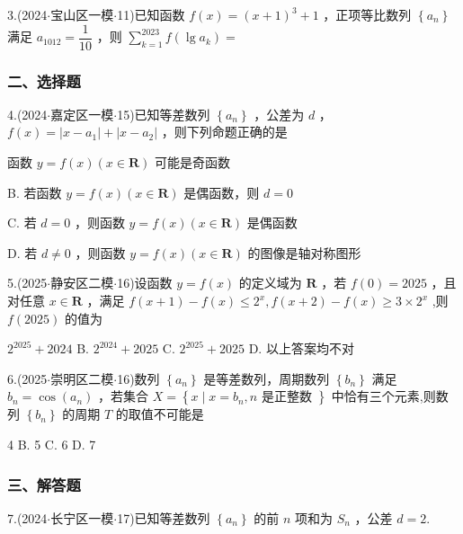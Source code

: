 3.(2024$\cdot$宝山区一模$\cdot$11)已知函数 $f\left( x\right)  = {\left( x + 1\right) }^{3} + 1$ ，正项等比数列 $\left\{  {a}_{n}\right\}$ 满足 ${a}_{1012} = \dfrac{1}{10}$ ，则 $\mathop{\sum }\limits_{{k = 1}}^{{2023}}f\left( {\lg {a}_{k}}\right)  =$

\subsubsection*{二、选择题}

4.(2024$\cdot$嘉定区一模$\cdot$15)已知等差数列 $\left\{  {a}_{n}\right\}$ ，公差为 $d$ ， $f\left( x\right)  = \left| {x - {a}_{1}}\right|  + \left| {x - {a}_{2}}\right|$ ，则下列命题正确的是 \dotfill{(\kh{})}

\xx{}{}{}{}函数 $y = f\left( x\right) \left( {x \in  \mathbf{R}}\right)$ 可能是奇函数

B. 若函数 $y = f\left( x\right) \left( {x \in  \mathbf{R}}\right)$ 是偶函数，则 $d = 0$

C. 若 $d = 0$ ，则函数 $y = f\left( x\right) \left( {x \in  \mathbf{R}}\right)$ 是偶函数

D. 若 $d \neq  0$ ，则函数 $y = f\left( x\right) \left( {x \in  \mathbf{R}}\right)$ 的图像是轴对称图形

5.(2025$\cdot$静安区二模$\cdot$16)设函数 $y = f\left( x\right)$ 的定义域为 $\mathbf{R}$ ，若 $f\left( 0\right)  = {2025}$ ，且对任意 $x \in  \mathbf{R}$ ，满足 $f\left( {x + 1}\right)  - f\left( x\right)  \leq  {2}^{x},f\left( {x + 2}\right)  - f\left( x\right)  \geq  3 \times  {2}^{x}$ ,则 $f\left( {2025}\right)$ 的值为 \dotfill{(\kh{})}

\xx{}{}{}{}${2}^{2025} + {2024}$ B. ${2}^{2024} + {2025}$ C. ${2}^{2025} + {2025}$ D. 以上答案均不对

6.(2025$\cdot$崇明区二模$\cdot$16)数列 $\left\{  {a}_{n}\right\}$ 是等差数列，周期数列 $\left\{  {b}_{n}\right\}$ 满足 ${b}_{n} = \cos \left( {a}_{n}\right)$ ，若集合 $X =  \left\{  {x \mid  x = {b}_{n},n\text{ 是正整数 }}\right\}$ 中恰有三个元素,则数列 $\left\{  {b}_{n}\right\}$ 的周期 $T$ 的取值不可能是 \dotfill{(\kh{})}

\xx{}{}{}{}4 B. 5 C. 6 D. 7

\subsubsection*{三、解答题}

7.(2024$\cdot$长宁区一模$\cdot$17)已知等差数列 $\left\{  {a}_{n}\right\}$ 的前 $n$ 项和为 ${S}_{n}$ ，公差 $d = 2$.

